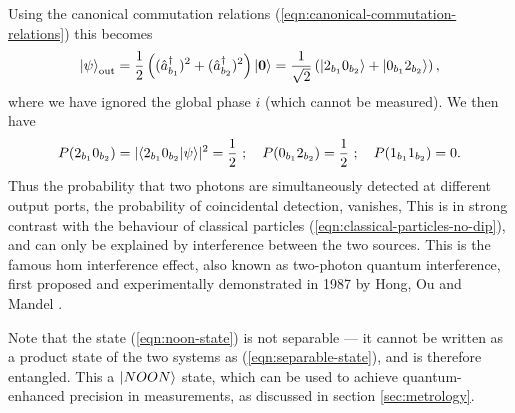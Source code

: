 Using the canonical commutation relations (\ref{eqn:canonical-commutation-relations})  this becomes
\begin{equation}
    \mbox{$ | \psi \rangle $}_{\mathrm{out}} = 
    \frac{1}{2} 
    \left(   (\hat{a}^{\dagger}_{b_1})^2  +  (\hat{a}^{\dagger}_{b_2})^2 \right) \mbox{$ | \mathbf{0} \rangle $}
    = \frac{1}{\sqrt{2}} \left( \mbox{$ | 2_{b_1}0_{b_2} \rangle $} + \mbox{$ | 0_{b_1}2_{b_2} \rangle $} \right) ,
    \label{eqn:noon-state}
\end{equation}
where we have ignored the global phase $i$ (which cannot be measured).
We then have
\begin{equation}
    P(2_{b_1}0_{b_2}) = |\langle 2_{b_1}0_{b_2} | \psi \rangle|^2 = \frac{1}{2}~; \quad 
    P(0_{b_1}2_{b_2}) = \frac{1}{2}~;\quad
    P(1_{b_1}1_{b_2}) = 0.
\end{equation}
Thus the probability that two photons are simultaneously detected at different output ports, the probability of coincidental detection, vanishes, This is in strong contrast with the behaviour of classical particles
(\ref{eqn:classical-particles-no-dip}), and can only be explained by interference between the two sources. This is the famous \gls{hom} interference effect, also known as two-photon quantum interference, first proposed and experimentally demonstrated in 1987 by Hong, Ou and Mandel \cite{Hong1987}. 

Note that the state (\ref{eqn:noon-state}) is not separable --- it cannot be written as a product state of the two systems as (\ref{eqn:separable-state}), and is therefore entangled. This a $\mbox{$ | NOON \rangle $}$ state, which can be used to achieve quantum-enhanced precision in measurements, as discussed in section \ref{sec:metrology}. 

